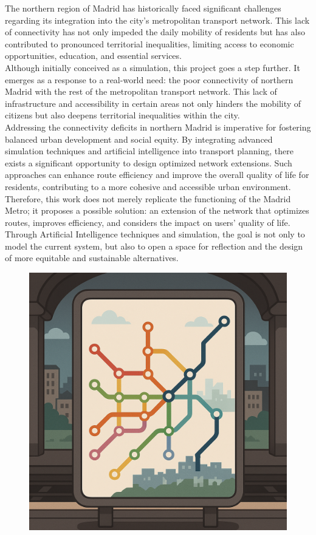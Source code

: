 \documentclass[a4paper,11pt,oneside]{book}
\begin{document}
The northern region of Madrid has historically faced significant challenges regarding its integration into the city's metropolitan transport network. This lack of connectivity has not only impeded the daily mobility of residents but has also contributed to pronounced territorial inequalities, limiting access to economic opportunities, education, and essential services.
~\\[0,5cm]
Although initially conceived as a simulation, this project goes a step further. It emerges as a response to a real-world need: the poor connectivity of northern Madrid with the rest of the metropolitan transport network. This lack of infrastructure and accessibility in certain areas not only hinders the mobility of citizens but also deepens territorial inequalities within the city.
~\\[0,5cm]
Addressing the connectivity deficits in northern Madrid is imperative for fostering balanced urban development and social equity. By integrating advanced simulation techniques and artificial intelligence into transport planning, there exists a significant opportunity to design optimized network extensions. Such approaches can enhance route efficiency and improve the overall quality of life for residents, contributing to a more cohesive and accessible urban environment.
~\\[0,5cm]
Therefore, this work does not merely replicate the functioning of the Madrid Metro; it proposes a possible solution: an extension of the network that optimizes routes, improves efficiency, and considers the impact on users' quality of life. Through Artificial Intelligence techniques and simulation, the goal is not only to model the current system, but also to open a space for reflection and the design of more equitable and sustainable alternatives.
\begin{figure}
        \centering
        \vspace{-20 cm} 
        \includegraphics[width=0.49
        \linewidth]{image.png}
        
    \end{figure}
\end{document}
